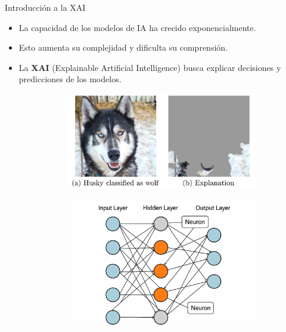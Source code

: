 

\begin{frame}{Introducción a la XAI}
    \begin{itemize}[<+- | alert@+>]
        \item La capacidad de los modelos de IA ha crecido exponencialmente.
        \item Esto aumenta su complejidad y dificulta su comprensión.
        \item La \textbf{XAI} (Explainable Artificial Intelligence) busca explicar decisiones y predicciones de los modelos.
        \begin{figure}[htbp]
        	\centering
        	\begin{subfigure}[b]{0.45\textwidth}
        		\centering
        		\includegraphics[width=\textwidth]{pic/img/XAI/explainabilityExample.png}
        	\end{subfigure}
        	\hfill
        	\begin{subfigure}[b]{0.45\textwidth}
        		\centering
        		\includegraphics[width=\textwidth]{pic/img/XAI/interpretabilityExample.png}
        	\end{subfigure}
        	

\end{figure}
\end{itemize}
\end{frame}
